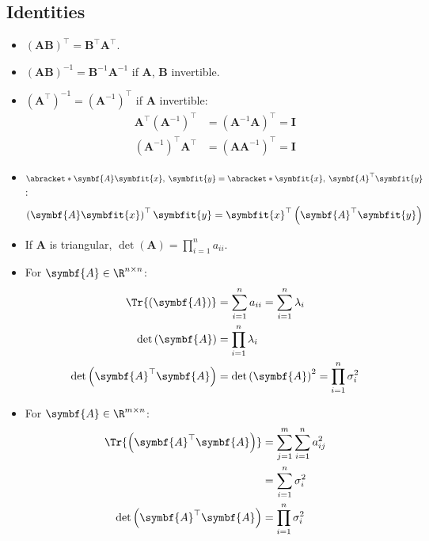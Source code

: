 \documentclass{article}
\begin{document}
\begin{multicols*}{3}
    \subsection{Identities}
    \begin{itemize}
        \item \(\left( \symbf{A} \symbf{B} \right)^\top = \symbf{B}^\top \symbf{A}^\top\).
        \item \(\left( \symbf{A} \symbf{B} \right)^{-1} = \symbf{B}^{-1} \symbf{A}^{-1}\) if \(\symbf{A}\), \(\symbf{B}\) invertible.
        \item \(\left( \symbf{A}^\top \right)^{-1} = \left( \symbf{A}^{-1} \right)^\top\) if \(\symbf{A}\) invertible:
              \begin{align*}
                  \symbf{A}^\top \left( \symbf{A}^{-1} \right)^\top & = \left( \symbf{A}^{-1} \symbf{A} \right)^\top = \symbf{I} \\
                  \left( \symbf{A}^{-1} \right)^\top \symbf{A}^\top & = \left( \symbf{A} \symbf{A}^{-1} \right)^\top = \symbf{I}
              \end{align*}
        \item \(\abracket*{\symbf{A}\symbfit{x},\: \symbfit{y}} = \abracket*{\symbfit{x},\: \symbf{A}^\top \symbfit{y}}\):
              \begin{equation*}
                  \left( \symbf{A} \symbfit{x} \right)^\top \symbfit{y} = \symbfit{x}^\top \left( \symbf{A}^\top \symbfit{y} \right)
              \end{equation*}
        \item If \(\symbf{A}\) is triangular, \(\det{\left( \symbf{A} \right)} = \prod_{i = 1}^n a_{ii}\).
        \item For \(\symbf{A} \in \R^{n \times n}\):
              \begin{align*}
                  \Tr{\left( \symbf{A} \right)}                 & = \sum_{i = 1}^n a_{ii} = \sum_{i = 1}^n \lambda_i              \\
                  \det{\left( \symbf{A} \right)}                & = \prod_{i = 1}^n \lambda_i                                     \\
                  \det{\left( \symbf{A}^\top \symbf{A} \right)} & = \det{\left( \symbf{A} \right)}^2 = \prod_{i = 1}^n \sigma_i^2
              \end{align*}
        \item For \(\symbf{A} \in \R^{m \times n}\):
              \begin{align*}
                  \Tr{\left( \symbf{A}^\top \symbf{A} \right)}  & = \sum_{j = 1}^m \sum_{i = 1}^n a_{ij}^2 \\
                                                                & = \sum_{i = 1}^n \sigma_i^2              \\
                  \det{\left( \symbf{A}^\top \symbf{A} \right)} & = \prod_{i = 1}^n \sigma_i^2
              \end{align*}
    \end{itemize}
\end{multicols*}
\end{document}
